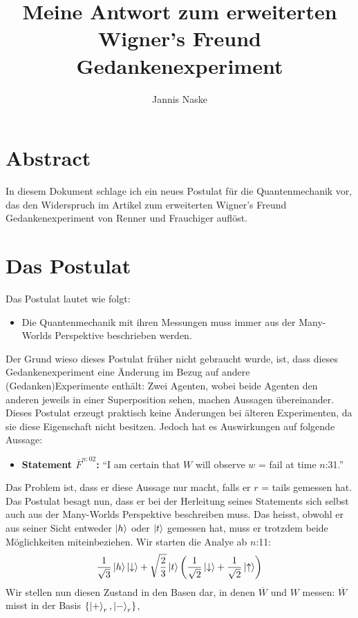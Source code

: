 \documentclass[a4paper]{article}
\title{Meine Antwort zum erweiterten Wigner's Freund Gedankenexperiment}
\author{Jannis Naske}
\begin{document}
\maketitle
\afterpage{\cfoot{\thepage}}

\section*{Abstract}
In diesem Dokument schlage ich ein neues Postulat für die Quantenmechanik vor, das den Widerspruch im Artikel zum erweiterten Wigner's Freund Gedankenexperiment von Renner und Frauchiger auflöst.

\section*{Das Postulat}
Das Postulat lautet wie folgt:
\begin{itemize}
	\item[] Die Quantenmechanik mit ihren Messungen muss immer aus der Many-Worlds Perspektive beschrieben werden.
\end{itemize}
Der Grund wieso dieses Postulat früher nicht gebraucht wurde, ist, dass dieses Gedankenexperiment eine Änderung im Bezug auf andere (Gedanken)Experimente enthält:
Zwei Agenten, wobei beide Agenten den anderen jeweils in einer Superposition sehen, machen Aussagen übereinander.
Dieses Postulat erzeugt praktisch keine Änderungen bei älteren Experimenten, da sie diese Eigenschaft nicht besitzen.
Jedoch hat es Auswirkungen auf folgende Aussage:
\begin{itemize}
	\item[] \textbf{Statement $\overline{F}^{n:02}$:} ``I am certain that $W$ will observe $w$ = fail at time $n$:31.''
\end{itemize}
Das Problem ist, dass er diese Aussage nur macht, falls er $r$ = tails gemessen hat. Das Postulat besagt nun, dass er bei der Herleitung seines Statements sich selbst
auch aus der Many-Worlds Perspektive beschreiben muss. Das heisst, obwohl er aus seiner Sicht entweder $\ket{h}$ oder $\ket{t}$ gemessen hat,
muss er trotzdem beide Möglichkeiten miteinbeziehen. Wir starten die Analye ab $n$:11:
\begin{align*}
\frac{1}{\sqrt{3}}\ket{h}\ket{\downarrow} + \sqrt{\frac{2}{3}}\ket{t}\qty(\frac{1}{\sqrt{2}} \ket{\downarrow} + \frac{1}{\sqrt{2}} \ket{\uparrow})
\end{align*}
Wir stellen nun diesen Zustand in den Basen dar, in denen $\overline{W}$ und $W$ messen:
$\overline{W}$ misst in der Basis $\qty{\ket{+}_{r}, \ket{-}_{r}}$,
\end{document}
